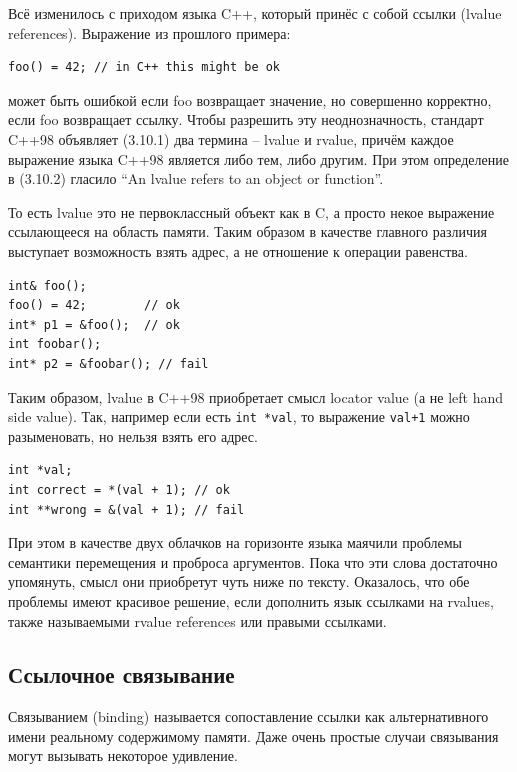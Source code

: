 \documentclass[a4paper,12pt,oneside]{book}
\begin{document}
Всё изменилось с приходом языка C++, который принёс с собой ссылки (lvalue references). Выражение из прошлого примера:

\begin{lstlisting}
foo() = 42; // in C++ this might be ok
\end{lstlisting}

может быть ошибкой если foo возвращает значение, но совершенно корректно, если foo возвращает ссылку. Чтобы разрешить эту неоднозначность, стандарт C++98 объявляет (3.10.1) два термина -- lvalue и rvalue, причём каждое выражение языка C++98 является либо тем, либо другим. При этом определение в (3.10.2) гласило ``An lvalue refers to an object or function''.

То есть lvalue это не первоклассный объект как в C, а просто некое выражение ссылающееся на область памяти. Таким образом в качестве главного различия выступает возможность взять адрес, а не отношение к операции равенства.

\begin{lstlisting}
int& foo();
foo() = 42;        // ok
int* p1 = &foo();  // ok
int foobar();
int* p2 = &foobar(); // fail
\end{lstlisting}

Таким образом, lvalue в C++98 приобретает смысл locator value (а не left hand side value). Так, например если есть \lstinline!int *val!, то выражение \lstinline!val+1! можно разыменовать, но нельзя взять его адрес.

\begin{lstlisting}
int *val;
int correct = *(val + 1); // ok
int **wrong = &(val + 1); // fail
\end{lstlisting}

При этом в качестве двух облачков на горизонте языка маячили проблемы семантики перемещения и проброса аргументов. Пока что эти слова достаточно упомянуть, смысл они приобретут чуть ниже по тексту. Оказалось, что обе проблемы имеют красивое решение, если дополнить язык ссылками на rvalues, также называемыми rvalue references или правыми ссылками.

\subsection{Ссылочное связывание}\label{subsub:refbinding}

Связыванием (binding) называется сопоставление ссылки как альтернативного имени реальному содержимому памяти. Даже очень простые случаи связывания могут вызывать некоторое удивление.
\end{document}
